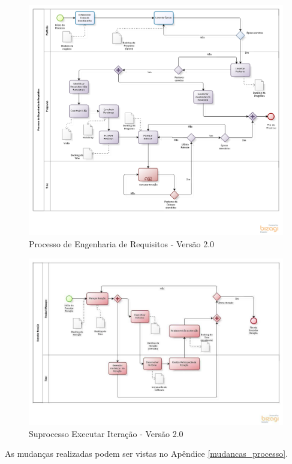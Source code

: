 \pagebreak
\begin{figure}[!htb]
\flushleft
\includegraphics[scale=0.6]{figuras/processo3.png}
\caption{Processo de Engenharia de Requisitos - Versão 2.0}
\label{fig:Processo}
\end{figure}

\begin{figure}[!htb]
\includegraphics[scale=0.5]{figuras/iteracao2.png}
\caption{Suprocesso Executar Iteração - Versão 2.0}
\label{fig:iteracao}
\end{figure}

\pagebreak
As mudanças realizadas podem ser vistas no Apêndice \ref{mudancas_processo}.

% 
% 
% 